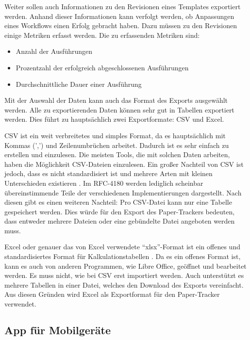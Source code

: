 Weiter sollen auch Informationen zu den Revisionen eines Templates exportiert werden.
Anhand dieser Informationen kann verfolgt werden, ob Anpassungen eines Workflows einen Erfolg gebracht haben.
Dazu müssen zu den Revisionen einige Metriken erfasst werden.
Die zu erfassenden Metriken sind:
\begin{itemize}
	\item Anzahl der Ausführungen
	\item Prozentzahl der erfolgreich abgeschlossenen Ausführungen
	\item Durchschnittliche Dauer einer Ausführung
\end{itemize}

Mit der Auswahl der Daten kann auch das Format des Exports ausgewählt werden.
Alle zu exportierenden Daten können sehr gut in Tabellen exportiert werden.
Dies führt zu hauptsächlich zwei Exportformate: \gls{CSV} und Excel.

\gls{CSV} ist ein weit verbreitetes und simples Format, da es hauptsächlich mit Kommas (',') und Zeilenumbrüchen arbeitet.
Dadurch ist es sehr einfach zu erstellen und einzulesen.
Die meisten Tools, die mit solchen Daten arbeiten, haben die Möglichkeit \gls{CSV}-Dateien einzulesen.
Ein großer Nachteil von \gls{CSV} ist jedoch, dass es nicht standardisiert ist und mehrere Arten
mit kleinen Unterschieden existieren \cite{rfc4180}.
Im RFC-4180 werden lediglich scheinbar übereinstimmende Teile der verschiedenen Implementierungen dargestellt.
Nach diesen gibt es einen weiteren Nachteil: Pro \gls{CSV}-Datei kann nur eine Tabelle gespeichert werden.
Dies würde für den Export des Paper-Trackers bedeuten, dass entweder mehrere Dateien oder eine gebündelte Datei angeboten werden muss.

Excel oder genauer das von Excel verwendete \enquote{xlsx}-Format ist ein offenes und standardisiertes Format
für Kalkulationstabellen \cite{iso29500}.
Da es ein offenes Format ist, kann es auch von anderen Programmen, wie Libre Office, geöffnet und bearbeitet werden.
Es muss nicht, wie bei \gls{CSV} erst importiert werden.
Auch unterstützt es mehrere Tabellen in einer Datei, welches den Download des Exports vereinfacht.
Aus diesen Gründen wird Excel als Exportformat für den Paper-Tracker verwendet.

\FloatBarrier
\subsection{App für Mobilgeräte} \label{sec:app}

